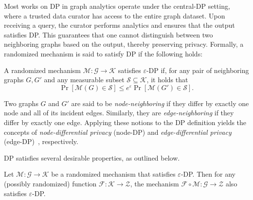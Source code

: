 






Most works on DP in graph analytics operate under the central-DP setting, where a trusted data curator has access to the entire graph dataset. 
Upon receiving a query, the curator performs analytics and ensures that the output satisfies DP. 
This guarantees that one cannot distinguish between two neighboring graphs based on the output, thereby preserving privacy.
Formally, a randomized mechanism is said to satisfy DP if the following holds:

\begin{definition}
\label{def:dp}
A randomized mechanism $\mathcal{M}: \mathcal{G} \to \mathcal{K}$ satisfies $\varepsilon$-DP if, for any pair of neighboring graphs $G, G'$ and any measurable subset $\mathcal{S} \subseteq \mathcal{K}$, it holds that
\begin{equation*}
    \Pr[\mathcal{M}(G) \in \mathcal{S}] \leq e^{\varepsilon} \Pr[\mathcal{M}(G') \in \mathcal{S}].
\end{equation*}
\end{definition}


Two graphs $G$ and $G'$ are said to be \textit{node-neighboring} if they differ by exactly one node and all of its incident edges. 
Similarly, they are \textit{edge-neighboring} if they differ by exactly one edge. 
Applying these notions to the DP definition yields the concepts of \textit{node-differential privacy} (node-DP) and \textit{edge-differential privacy} (edge-DP)~\cite{hay2009accurate}, respectively. 

DP satisfies several desirable properties, as outlined below.


\begin{lemma}
\label{lem:pp}
Let $\mathcal{M}: \mathcal{G} \to \mathcal{K}$ be a randomized mechanism that satisfies $\varepsilon$-DP. 
Then for any (possibly randomized) function $\mathcal{F}: \mathcal{K} \to \mathcal{Z}$, the mechanism $\mathcal{F} \circ \mathcal{M}: \mathcal{G} \to \mathcal{Z}$ also satisfies $\varepsilon$-DP. 
\end{lemma}


